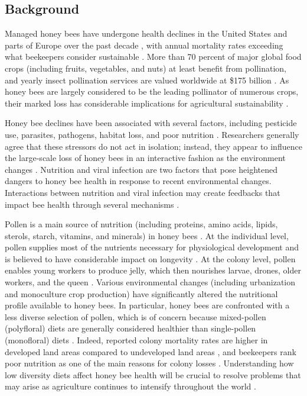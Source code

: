 \documentclass{bmcart}
\begin{document}
\begin{linenumbers} %
\begin{doublespacing} %

\section*{Background}

Managed honey bees have undergone health declines in the United States and parts of Europe over the past decade \cite{ccd1, ccd2, ccd3}, with annual mortality rates exceeding what beekeepers consider sustainable \cite{ccd5, ccd6}. More than 70 percent of major global food crops (including fruits, vegetables, and nuts) at least benefit from pollination, and yearly insect pollination services are valued worldwide at \$175 billion \cite{ccd7}. As honey bees are largely considered to be the leading pollinator of numerous crops, their marked loss has considerable implications for agricultural sustainability \cite{ccd4}.

Honey bee declines have been associated with several factors, including pesticide use, parasites, pathogens, habitat loss, and poor nutrition \cite{factors, factors2}. Researchers generally agree that these stressors do not act in isolation; instead, they appear to influence the large-scale loss of honey bees in an interactive fashion as the environment changes \cite{interacting}. Nutrition and viral infection are two factors that pose heightened dangers to honey bee health in response to recent environmental changes. Interactions between nutrition and viral infection may create feedbacks that impact bee health through several mechanisms \cite{adamInt, AdamTothReview}. 

Pollen is a main source of nutrition (including proteins, amino acids, lipids, sterols, starch, vitamins, and minerals) in honey bees \cite{source, source2}. At the individual level, pollen supplies most of the nutrients necessary for physiological development \cite{brodschneider} and is believed to have considerable impact on longevity \cite{longevity}. At the colony level, pollen enables young workers to produce jelly, which then nourishes larvae, drones, older workers, and the queen \cite{jelly, jelly2}. Various environmental changes (including urbanization and monoculture crop production) have significantly altered the nutritional profile available to honey bees. In particular, honey bees are confronted with a less diverse selection of pollen, which is of concern because mixed-pollen (polyfloral) diets are generally considered healthier than single-pollen (monofloral) diets \cite{diverse, diverse2, alaux}. Indeed, reported colony mortality rates are higher in developed land areas compared to undeveloped land areas \cite{undeveloped}, and beekeepers rank poor nutrition as one of the main reasons for colony losses \cite{bkLoss}. Understanding how low diversity diets affect honey bee health will be crucial to resolve problems that may arise as agriculture continues to intensify throughout the world \cite{ag, ag2}.


\end{doublespacing}
\end{linenumbers}
\end{document}
